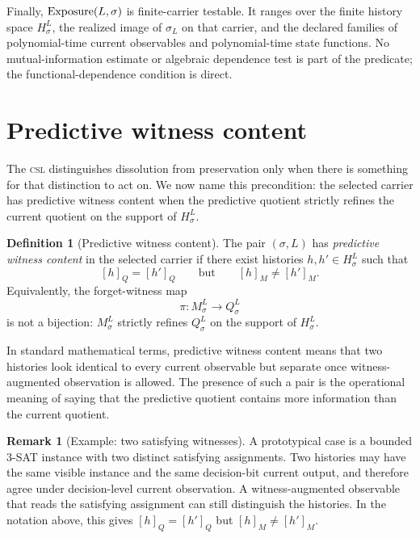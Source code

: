 \documentclass[11pt]{article}
\newcommand{\CSL}{\textsc{csl}}            \newcommand{\CSLcore}{Candidate Structural Law}
\newcommand{\Substrate}{\sigma}             \newcommand{\Lift}{L}                       \newcommand{\LiftState}{\sigma_{L}}         \newcommand{\HistorySpace}{H_{\Substrate}^{\Lift}}
\newcommand{\Qquotient}{Q_{\Substrate}^{\Lift}}
\newcommand{\Mquotient}{M_{\Substrate}^{\Lift}}
\newcommand{\ForgetWitnessMap}{\pi}
\newcommand{\Qclass}[1]{[#1]_{Q}}
\newcommand{\Mclass}[1]{[#1]_{M}}
\theoremstyle{definition}
\newtheorem{definition}[theorem]{Definition}
\newtheorem{remark}[theorem]{Remark}
\begin{document}
Finally, \(\Exposure(\Lift,\Substrate)\) is finite-carrier testable.
It ranges over the finite history space \(\HistorySpace\), the
realized image of \(\LiftState\) on that carrier, and the declared
families of polynomial-time current observables and polynomial-time
state functions.  No mutual-information estimate or algebraic
dependence test is part of the predicate; the functional-dependence
condition is direct.
 

\section{Predictive witness content}
\label{sec:witness-content}

The \CSL{} distinguishes dissolution from preservation only when there
is something for that distinction to act on.  We now name this
precondition: the selected carrier has predictive witness content when
the predictive quotient strictly refines the current quotient on the
support of \(\HistorySpace\).

\begin{definition}[Predictive witness content]
\label{def:predictive-witness-content}
The pair \((\Substrate,\Lift)\) has \emph{predictive witness content}
in the selected carrier if there exist histories
\(h,h'\in\HistorySpace\) such that
\[
  \Qclass{h}=\Qclass{h'}
  \qquad\text{but}\qquad
  \Mclass{h}\neq\Mclass{h'} .
\]
Equivalently, the forget-witness map
\[
  \ForgetWitnessMap:\Mquotient\to\Qquotient
\]
is not a bijection: \(\Mquotient\) strictly refines \(\Qquotient\) on
the support of \(\HistorySpace\).
\end{definition}

In standard mathematical terms, predictive witness content means that
two histories look identical to every current observable but separate
once witness-augmented observation is allowed.  The presence of such a
pair is the operational meaning of saying that the predictive quotient
contains more information than the current quotient.

\begin{remark}[Example: two satisfying witnesses]
A prototypical case is a bounded 3-SAT instance
\citep{Cook1971TheoremProving,GareyJohnson1979Intractability} with two
distinct satisfying assignments.  Two histories may have the same visible
instance and the same decision-bit current output, and therefore agree
under decision-level current observation.  A witness-augmented
observable that reads the satisfying assignment can still distinguish
the histories.  In the notation above, this gives
\(\Qclass{h}=\Qclass{h'}\) but
\(\Mclass{h}\neq\Mclass{h'}\).
\end{remark}
\end{document}
